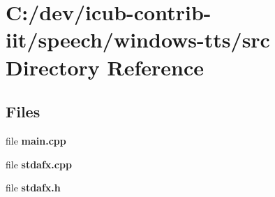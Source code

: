 \section{C\+:/dev/icub-\/contrib-\/iit/speech/windows-\/tts/src Directory Reference}
\label{dir_f193454629d50d9e0d1b2474421923c7}
\subsection*{Files}
\begin{DoxyCompactItemize}
\item 
file {\bfseries main.\+cpp}
\item 
file {\bfseries stdafx.\+cpp}
\item 
file {\bfseries stdafx.\+h}
\end{DoxyCompactItemize}
